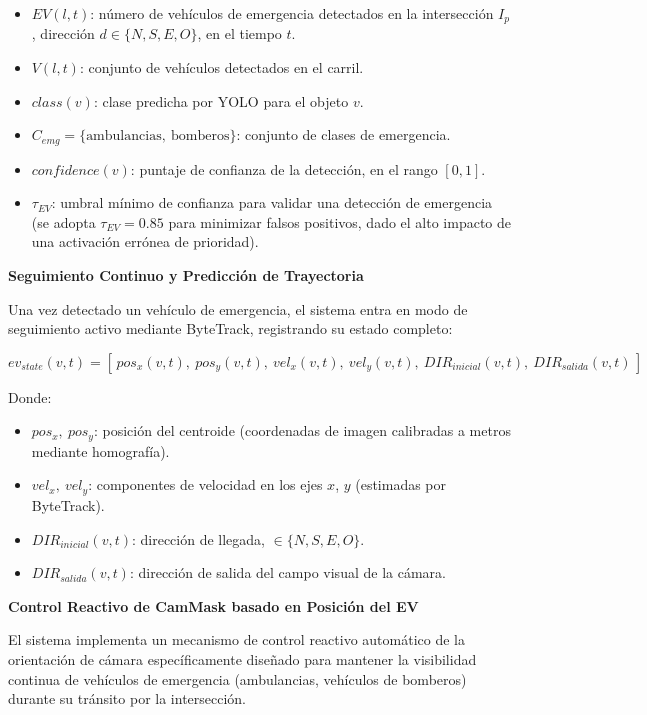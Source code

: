 \documentclass[12pt,a4paper,oneside]{report}
\begin{document}
\begin{itemize}
\item
  \(EV(l,t)\): número de vehículos de emergencia detectados en la intersección \(I_{p}\), dirección \(d \in \{N, S, E, O\}\), en el tiempo \(t\).
\item
  \(V(l,t)\): conjunto de vehículos detectados en el carril.
\item
  \(class(v)\): clase predicha por YOLO para el objeto \(v\).
\item
  \(C_{emg} = \{\text{ambulancias},\ \text{bomberos}\}\): conjunto de clases de emergencia.
\item
  \(confidence(v)\): puntaje de confianza de la detección, en el rango \([0,1]\).
\item
  \(\tau_{EV}\): umbral mínimo de confianza para validar una detección de emergencia (se adopta \(\tau_{EV} = 0.85\) para minimizar falsos positivos, dado el alto impacto de una activación errónea de prioridad).
\end{itemize}

\textbf{Seguimiento Continuo y Predicción de Trayectoria}

Una vez detectado un vehículo de emergencia, el sistema entra en modo de seguimiento activo mediante ByteTrack, registrando su estado completo:

\begin{equation}
ev_{state}(v,t) = \left[\, pos_{x}(v,t),\ pos_{y}(v,t),\ vel_{x}(v,t),\ vel_{y}(v,t),\ DIR_{inicial}(v,t),\ DIR_{salida}(v,t) \,\right]
\label{eq:evstate}
\end{equation}

Donde:

\begin{itemize}
\item
  \(pos_{x},\ pos_{y}\): posición del centroide (coordenadas de imagen calibradas a metros mediante homografía).
\item
  \(vel_{x},\ vel_{y}\): componentes de velocidad en los ejes \(x\), \(y\) (estimadas por ByteTrack).
\item
  \(DIR_{inicial}(v,t)\): dirección de llegada, \(\in \{N, S, E, O\}\).
\item
  \(DIR_{salida}(v,t)\): dirección de salida del campo visual de la cámara.
\end{itemize}

\textbf{Control Reactivo de CamMask basado en Posición del EV}

El sistema implementa un mecanismo de control reactivo automático de la orientación de cámara específicamente diseñado para mantener la visibilidad continua de vehículos de emergencia (ambulancias, vehículos de bomberos) durante su tránsito por la intersección.
\end{document}

